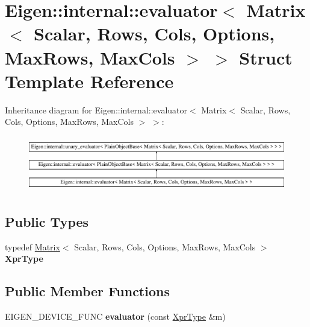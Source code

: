 \hypertarget{struct_eigen_1_1internal_1_1evaluator_3_01_matrix_3_01_scalar_00_01_rows_00_01_cols_00_01_optionc8e41d58a4f0b7a4fe2e5592b375183d}{}\section{Eigen\+::internal\+::evaluator$<$ Matrix$<$ Scalar, Rows, Cols, Options, Max\+Rows, Max\+Cols $>$ $>$ Struct Template Reference}
\label{struct_eigen_1_1internal_1_1evaluator_3_01_matrix_3_01_scalar_00_01_rows_00_01_cols_00_01_optionc8e41d58a4f0b7a4fe2e5592b375183d}
Inheritance diagram for Eigen\+::internal\+::evaluator$<$ Matrix$<$ Scalar, Rows, Cols, Options, Max\+Rows, Max\+Cols $>$ $>$\+:\begin{figure}[H]
\begin{center}
\leavevmode
\includegraphics[height=2.463343cm]{struct_eigen_1_1internal_1_1evaluator_3_01_matrix_3_01_scalar_00_01_rows_00_01_cols_00_01_optionc8e41d58a4f0b7a4fe2e5592b375183d}
\end{center}
\end{figure}
\subsection*{Public Types}
\begin{DoxyCompactItemize}
\item 
\mbox{\label{struct_eigen_1_1internal_1_1evaluator_3_01_matrix_3_01_scalar_00_01_rows_00_01_cols_00_01_optionc8e41d58a4f0b7a4fe2e5592b375183d_a298aded1f8f4a52612b203103c96a142}} 
typedef \mbox{\hyperlink{class_eigen_1_1_matrix}{Matrix}}$<$ Scalar, Rows, Cols, Options, Max\+Rows, Max\+Cols $>$ {\bfseries Xpr\+Type}
\end{DoxyCompactItemize}
\subsection*{Public Member Functions}
\begin{DoxyCompactItemize}
\item 
\mbox{\label{struct_eigen_1_1internal_1_1evaluator_3_01_matrix_3_01_scalar_00_01_rows_00_01_cols_00_01_optionc8e41d58a4f0b7a4fe2e5592b375183d_afcc27bd4179b8c2836a1793fe40ac9ef}} 
E\+I\+G\+E\+N\+\_\+\+D\+E\+V\+I\+C\+E\+\_\+\+F\+U\+NC {\bfseries evaluator} (const \mbox{\hyperlink{class_eigen_1_1_matrix}{Xpr\+Type}} \&m)
\end{DoxyCompactItemize}


